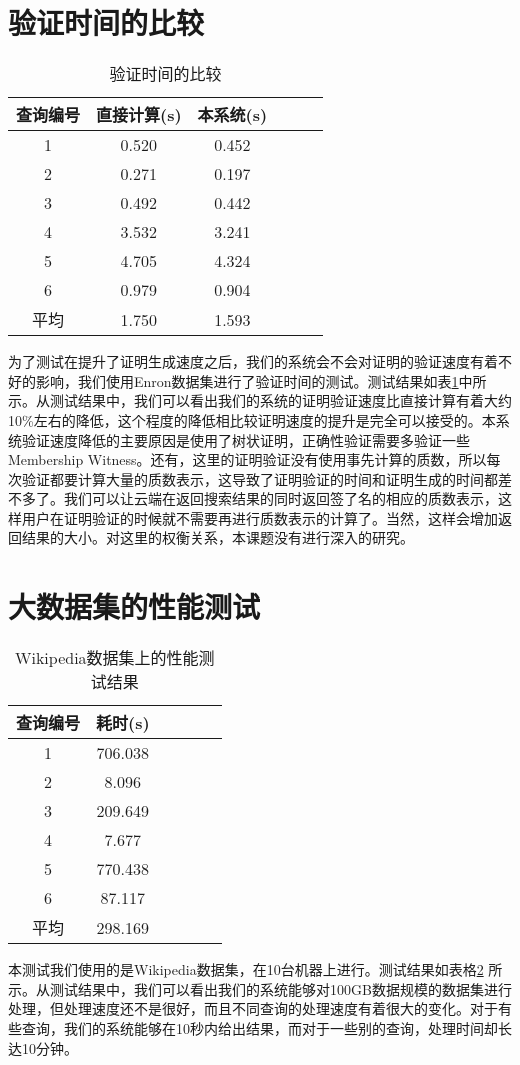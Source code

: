 \section{验证时间的比较}
\begin{table}[htb]
    \centering
    \caption{验证时间的比较}
    \begin{tabular}{cccccc}
        \toprule
        查询编号 & 直接计算(s) & 本系统(s) \\
        \midrule
        1 & 0.520 & 0.452 \\
        2 & 0.271 & 0.197 \\
        3 & 0.492 & 0.442 \\
        4 & 3.532 & 3.241 \\
        5 & 4.705 & 4.324 \\
        6 & 0.979 & 0.904 \\
        \midrule
        平均 & 1.750 & 1.593 \\
        \bottomrule
    \end{tabular}
    \label{tab:verifying_time}
\end{table}
为了测试在提升了证明生成速度之后，我们的系统会不会对证明的验证速度有着不好的影响，我们使用Enron数据集进行了验证时间的测试。测试结果如表\ref{tab:verifying_time}中所示。从测试结果中，我们可以看出我们的系统的证明验证速度比直接计算有着大约10\%左右的降低，这个程度的降低相比较证明速度的提升是完全可以接受的。本系统验证速度降低的主要原因是使用了树状证明，正确性验证需要多验证一些Membership Witness。还有，这里的证明验证没有使用事先计算的质数，所以每次验证都要计算大量的质数表示，这导致了证明验证的时间和证明生成的时间都差不多了。我们可以让云端在返回搜索结果的同时返回签了名的相应的质数表示，这样用户在证明验证的时候就不需要再进行质数表示的计算了。当然，这样会增加返回结果的大小。对这里的权衡关系，本课题没有进行深入的研究。

\section {大数据集的性能测试}
\begin{table}[htb]
    \centering
    \caption{Wikipedia数据集上的性能测试结果}
    \begin{tabular}{cccccc}
        \toprule
        查询编号 & 耗时(s) \\
        \midrule
        1 & 706.038  \\
        2 & 8.096  \\
        3 & 209.649  \\
        4 & 7.677  \\
        5 & 770.438  \\
        6 & 87.117  \\
        \midrule
        平均 & 298.169  \\
        \bottomrule
    \end{tabular}
    \label{tab:wiki_speedup}
\end{table}
本测试我们使用的是Wikipedia数据集，在10台机器上进行。测试结果如表格\ref{tab:wiki_speedup} 所示。从测试结果中，我们可以看出我们的系统能够对100GB数据规模的数据集进行处理，但处理速度还不是很好，而且不同查询的处理速度有着很大的变化。对于有些查询，我们的系统能够在10秒内给出结果，而对于一些别的查询，处理时间却长达10分钟。
